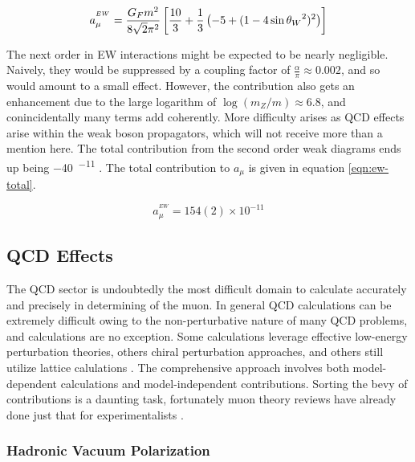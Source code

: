 \begin{equation}
\label{eqn:weak-lowest-order}
a_\mu^{^{EW}} = \frac{G_F m^2}{8\sqrt{2}\pi^2} \\
\left[\frac{10}{3} + \frac{1}{3} \left(-5 + (1 - 4\sin{\theta_W}^2)^2 \right) \right]
\end{equation}

The next order in EW interactions might be expected to be nearly negligible.  Naively, they would be suppressed by a coupling factor of $\frac{\alpha}{\pi} \approx 0.002$, and so would amount to a small effect.  However, the contribution also gets an enhancement due to the large logarithm of $\log(m_Z/m) \approx 6.8$, and conincidentally many terms add coherently.  More difficulty arises as QCD effects arise within the weak boson propagators, which will not receive more than a mention here.  The total contribution from the second order weak diagrams ends up being \SI{-40}{^{-11}} \cite{the-muon-g-2}.  The total contribution to $a_\mu$ is given in equation \ref{eqn:ew-total}. 

\begin{equation}
\label{eqn:ew-total}
a_\mu^{^{EW}} = 154(2) \times 10^{-11}
\end{equation}

\subsection{QCD Effects} \label{s-sec:theory-qcd}

The QCD sector is undoubtedly the most difficult domain to calculate accurately and precisely in determining \gmtwo of the muon.  In general QCD calculations can be extremely difficult owing to the non-perturbative nature of many QCD problems, and \mugmtwo calculations are no exception.  Some calculations leverage effective low-energy perturbation theories, others chiral perturbation approaches, and others still utilize lattice calulations \cite{the-muon-g-2}.  The comprehensive approach involves both model-dependent calculations and model-independent contributions.  Sorting the bevy of contributions is a daunting task, fortunately muon \gmtwo theory reviews have already done just that for experimentalists \cite{the-muon-g-2, a-mu-harbinger, muon-g-2-blum, muon-g-2-hadronic-jegerlehner}.

\subsubsection{Hadronic Vacuum Polarization}

